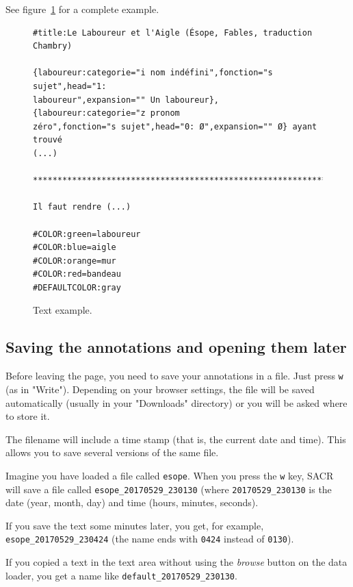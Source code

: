 \documentclass[12pt]{article}
\begin{document}
See figure~\ref{fig-sacr-example-text} for a complete example.

\begin{figure}[tbp]
\begin{mdframed}
\begin{verbatim}
#title:Le Laboureur et l'Aigle (Ésope, Fables, traduction Chambry)

{laboureur:categorie="i nom indéfini",fonction="s sujet",head="1:
laboureur",expansion="" Un laboureur}, {laboureur:categorie="z pronom
zéro",fonction="s sujet",head="0: Ø",expansion="" Ø} ayant trouvé
(...)

************************************************************************

Il faut rendre (...)

#COLOR:green=laboureur
#COLOR:blue=aigle
#COLOR:orange=mur
#COLOR:red=bandeau
#DEFAULTCOLOR:gray
\end{verbatim}
\end{mdframed}
\caption{Text example.}\label{fig-sacr-example-text}
\end{figure}


 \subsection{Saving the annotations and opening them later}

Before leaving the page, you need to save your annotations in a file.  Just
press \verb|w| (as in "Write").  Depending on your browser settings, the file
will be saved automatically (usually in your "Downloads" directory) or you
will be asked where to store it.

The filename will include a time stamp (that is, the current date and time).
This allows you to save several versions of the same file.

Imagine you have loaded a file called \verb|esope|.  When you press the
\verb|w| key, SACR will save a file called \verb|esope_20170529_230130|
(where \verb|20170529_230130| is the date (year, month, day) and time (hours,
minutes, seconds).

If you save the text some minutes later, you get, for example,
\verb|esope_20170529_230424| (the name ends with \verb|0424| instead of
\verb|0130|).

If you copied a text in the text area without using the \emph{browse} button
on the data loader, you get a name like \verb|default_20170529_230130|.
\end{document}
